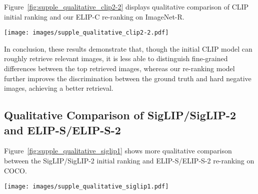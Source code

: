 \clearpage
Figure~\ref{fig:supple_qualitative_clip2-2} displays qualitative comparison of CLIP initial ranking and our ELIP-C re-ranking on ImageNet-R. 

\begin{figure*}[h]
	\centering
\texttt{[image: images/supple\_qualitative\_clip2-2.pdf]}
	\caption{
\textbf{Qualitative Comparison on ImageNet-R for CLIP and ELIP-C.} We display examples at the top-100 rankings where there is a difference between the two models, \emph{i.e.,} one model retrieves a positive sample while the other model retrieves a negative sample, as the majority of the top-100 retrieves samples are positive. \emph{Generally, ELIP-C retrieves more positive samples in top-100 images than CLIP}. Negative samples (errors) are highlighted in an orange solid box. 
For the first example, the text query is `hen' and CLIP retrieves some `duck's in top-100 retrieved images; for the second example, the text query is `baseball player' and CLIP retrieves some players for other ball games in the top-100 retrieved images while our ELIP-C retrieves a basketball player in top-100 images.  
	} 
	\label{fig:supple_qualitative_clip2-2}
	\end{figure*}

\clearpage
In conclusion, these results demonstrate that, though the initial CLIP model can roughly retrieve relevant images, it is less able to distinguish fine-grained differences between the top retrieved images, whereas our re-ranking model further improves the discrimination between the ground truth and hard negative images, achieving a better retrieval.








\clearpage
\subsection{Qualitative Comparison of SigLIP/SigLIP-2 and ELIP-S/ELIP-S-2}

Figure~\ref{fig:supple_qualitative_siglip1} shows more qualitative comparison between the SigLIP/SigLIP-2 initial ranking and ELIP-S/ELIP-S-2 re-ranking on COCO. 

\begin{figure*}[h]
	\centering
\texttt{[image: images/supple\_qualitative\_siglip1.pdf]}
	\caption{
\textbf{Qualitative Comparison on COCO for SigLIP and ELIP-S (top), SigLIP-2 and ELIP-S-2 (bottom).} For each example, we show both top-5 rankings (from left to right) and highlight the ground truth image in a black dashed box.
In the first (SigLIP v.s. ELIP-S) and second (SigLIP-2 v.s. ELIP-S-2) examples (from top to bottom), the text queries are `A small blue plane sitting on top of a field', and `Assortment of doughnuts and other snack items on a serving tray', and the ground truth images are not in top-5 images of the SigLIP/SigLIP-2 initial ranking, but ranked top-1 in our ELIP-S/ELIP-S-2 re-ranking. 
	} 
	\label{fig:supple_qualitative_siglip1}
	\end{figure*}


